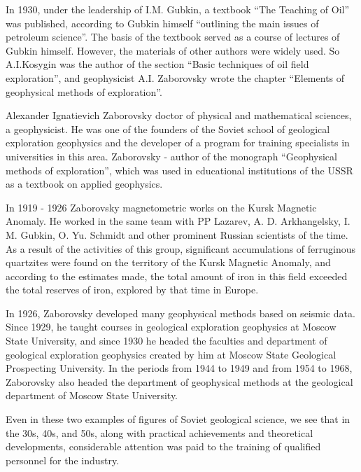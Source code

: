 \documentclass[12pt]{report}
\theoremstyle{definition}
\begin{document}
In 1930, under the leadership of I.M. Gubkin, a textbook ``The Teaching of Oil'' was published, according to Gubkin himself ``outlining the main issues of petroleum science''.
The basis of the textbook served as a course of lectures of Gubkin himself. However, the materials of other authors were widely used.
So A.I.Kosygin was the author of the section ``Basic techniques of oil field exploration'', and geophysicist A.I. Zaborovsky wrote the chapter ``Elements of geophysical methods of exploration''.

Alexander Ignatievich Zaborovsky doctor of physical and mathematical sciences, a geophysicist.
He was one of the founders of the Soviet school of geological exploration geophysics and the developer of a program for training specialists in universities in this area.
Zaborovsky - author of the monograph ``Geophysical methods of exploration'', which was used in educational institutions of the USSR as a textbook on applied geophysics.

In 1919 - 1926 Zaborovsky magnetometric works on the Kursk Magnetic Anomaly.
He worked in the same team with PP Lazarev, A. D. Arkhangelsky, I. M. Gubkin, O. Yu. Schmidt and other prominent Russian scientists of the time.
As a result of the activities of this group, significant accumulations of ferruginous quartzites were found on the territory of the Kursk Magnetic Anomaly, and according to the estimates made, the total amount of iron in this field exceeded the total reserves of iron, explored by that time in Europe.

In 1926, Zaborovsky developed many geophysical methods based on seismic data.
Since 1929, he taught courses in geological exploration geophysics at Moscow State University, and since 1930 he headed the faculties and department of geological exploration geophysics created by him at Moscow State Geological Prospecting University.
In the periods from 1944 to 1949 and from 1954 to 1968, Zaborovsky also headed the department of geophysical methods at the geological department of Moscow State University.

Even in these two examples of figures of Soviet geological science, we see that in the 30s, 40s, and 50s, along with practical achievements and theoretical developments, considerable attention was paid to the training of qualified personnel for the industry.
\end{document}
